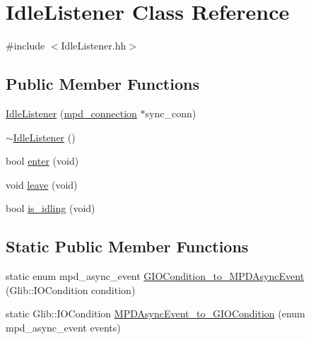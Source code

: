 \hypertarget{classIdleListener}{
\section{\-Idle\-Listener \-Class \-Reference}
\label{classIdleListener}
}


{\ttfamily \#include $<$\-Idle\-Listener.\-hh$>$}

\subsection*{\-Public \-Member \-Functions}
\begin{DoxyCompactItemize}
\item 
\hyperlink{classIdleListener_a25267143c7862e62d38c123614580b06}{\-Idle\-Listener} (\hyperlink{includes_8hh_a83791b93fccbeae334f6cd9d4201e024}{mpd\-\_\-connection} $\ast$sync\-\_\-conn)
\item 
\hyperlink{classIdleListener_adfb1307db570ffd340c48b1862028a7a}{$\sim$\-Idle\-Listener} ()
\item 
bool \hyperlink{classIdleListener_a22b4332b195f9970f69078f1d00eddc3}{enter} (void)
\item 
void \hyperlink{classIdleListener_af07253352ccb6be4d625429cd89d1db2}{leave} (void)
\item 
bool \hyperlink{classIdleListener_acf825054545a28277d674b99222cd80c}{is\-\_\-idling} (void)
\end{DoxyCompactItemize}
\subsection*{\-Static \-Public \-Member \-Functions}
\begin{DoxyCompactItemize}
\item 
static enum mpd\-\_\-async\-\_\-event \hyperlink{classIdleListener_a8df233f7b67dcef60fd1a47f7b3035f6}{\-G\-I\-O\-Condition\-\_\-to\-\_\-\-M\-P\-D\-Async\-Event} (\-Glib\-::\-I\-O\-Condition condition)
\item 
static \-Glib\-::\-I\-O\-Condition \hyperlink{classIdleListener_abc39250e7ef9977d2071a469b9088649}{\-M\-P\-D\-Async\-Event\-\_\-to\-\_\-\-G\-I\-O\-Condition} (enum mpd\-\_\-async\-\_\-event events)
\end{DoxyCompactItemize}


